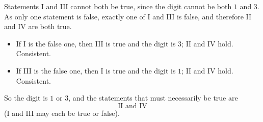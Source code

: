 Statements I and III cannot both be true, since the digit cannot be both $1$ and $3$. As only one statement is false, exactly one of I and III is false, and therefore II and IV are both true.
\begin{itemize}
\item If I is the false one, then III is true and the digit is $3$; II and IV hold. Consistent.
\item If III is the false one, then I is true and the digit is $1$; II and IV hold. Consistent.
\end{itemize}
So the digit is $1$ or $3$, and the statements that must necessarily be true are
\[
\boxed{\text{II and IV}}
\]
(I and III may each be true or false).
